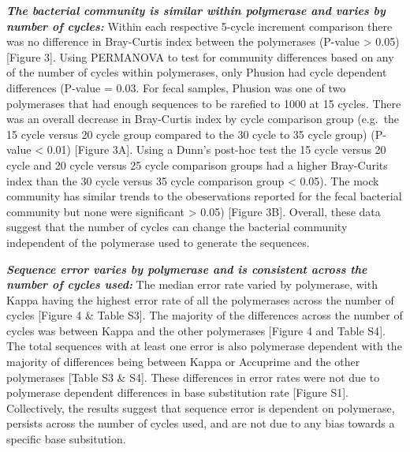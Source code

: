 \documentclass[11pt,]{article}
\begin{document}
\textbf{\emph{The bacterial community is similar within polymerase and
varies by number of cycles:}} Within each respective 5-cycle increment
comparison there was no difference in Bray-Curtis index between the
polymerases (P-value \textgreater{} 0.05) {[}Figure 3{]}. Using
PERMANOVA to test for community differences based on any of the number
of cycles within polymerases, only Phusion had cycle dependent
differences (P-value = 0.03. For fecal samples, Phusion was one of two
polymerases that had enough sequences to be rarefied to 1000 at 15
cycles. There was an overall decrease in Bray-Curtis index by cycle
comparison group (e.g.~the 15 cycle versus 20 cycle group compared to
the 30 cycle to 35 cycle group) (P-value \textless{} 0.01) {[}Figure
3A{]}. Using a Dunn's post-hoc test the 15 cycle versus 20 cycle and 20
cycle versus 25 cycle comparison groups had a higher Bray-Curits index
than the 30 cycle versus 35 cycle comparison group \textless{} 0.05).
The mock community has similar trends to the obeservations reported for
the fecal bacterial community but none were significant \textgreater{}
0.05) {[}Figure 3B{]}. Overall, these data suggest that the number of
cycles can change the bacterial community independent of the polymerase
used to generate the sequences.

\textbf{\emph{Sequence error varies by polymerase and is consistent
across the number of cycles used:}} The median error rate varied by
polymerase, with Kappa having the highest error rate of all the
polymerases across the number of cycles {[}Figure 4 \& Table S3{]}. The
majority of the differences across the number of cycles was between
Kappa and the other polymerases {[}Figure 4 and Table S4{]}. The total
sequences with at least one error is also polymerase dependent with the
majority of differences being between Kappa or Accuprime and the other
polymerases {[}Table S3 \& S4{]}. These differences in error rates were
not due to polymerase dependent differences in base substitution rate
{[}Figure S1{]}. Collectively, the results suggest that sequence error
is dependent on polymerase, persists across the number of cycles used,
and are not due to any bias towards a specific base subsitution.
\end{document}
